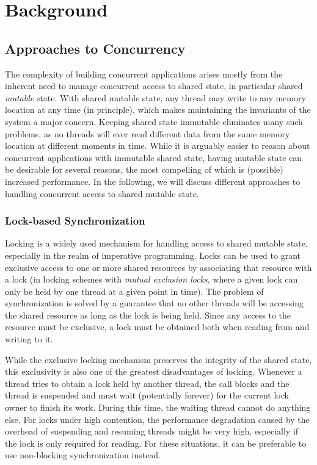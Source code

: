 \section{Background}
\label{sec:background}

\subsection{Approaches to Concurrency}
The complexity of building concurrent applications arises mostly from the inherent need to manage concurrent access to shared state, in particular shared \emph{mutable} state. With shared mutable state, any thread may write to any memory location at any time (in principle), which makes maintaining the invariants of the system a major concern. Keeping shared state immutable eliminates many such problems, as no threads will ever read different data from the same memory location at different moments in time. While it is arguably easier to reason about concurrent applications with immutable shared state, having mutable state can be desirable for several reasons, the most compelling of which is (possible) increased performance. In the following, we will discuss different approaches to handling concurrent access to shared mutable state.


\subsubsection{Lock-based Synchronization}
Locking is a widely used mechanism for handling access to shared mutable state, especially in the realm of imperative programming. Locks can be used to grant exclusive access to one or more shared resources by associating that resource with a lock (in locking schemes with \emph{mutual exclusion locks}, where a given lock can only be held by one thread at a given point in time). The problem of synchronization is solved by a guarantee that no other threads will be accessing the shared resource as long as the lock is being held. Since any access to the resource must be exclusive, a lock must be obtained both when reading from and writing to it. 

While the exclusive locking mechanism preserves the integrity of the shared state, this exclusivity is also one of the greatest disadvantages of locking. Whenever a thread tries to obtain a lock held by another thread, the call blocks and the thread is suspended and must wait (potentially forever) for the current lock owner to finish its work. During this time, the waiting thread cannot do anything else. For locks under high contention, the performance degradation caused by the overhead of suspending and resuming threads might be very high, especially if the lock is only required for reading. For these situations, it can be preferable to use non-blocking synchronization instead.

